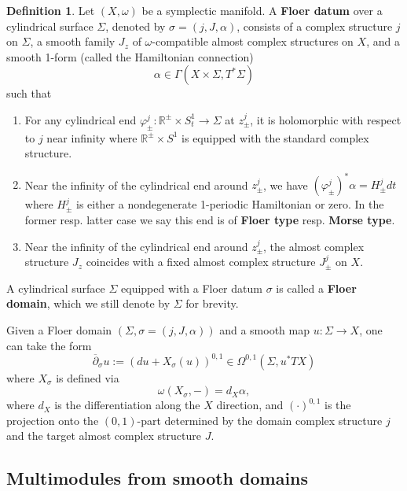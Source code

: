 \documentclass[reqno, 10pt]{amsart}
\numberwithin{equation}{section}
\numberwithin{equation}{section}
\theoremstyle{definition}
\newtheorem{defn}[thm]{Definition}
\theoremstyle{remark}
\newcommand{\beqn}{\begin{equation*}}
\newcommand{\eeqn}{\end{equation*}}
\newcommand{\ov}{\overline}
\newcommand{\mb}{\mathbb}
\begin{document}
\begin{defn}\label{defn_Floer_datum}
Let $(X, \omega)$ be a symplectic manifold. A {\bf Floer datum} over a cylindrical surface $\Sigma$, denoted by $\sigma = (j, J, \alpha)$, consists of a complex structure $j$ on $\Sigma$, a smooth family $J_z$ of $\omega$-compatible almost complex structures on $X$, and a smooth 1-form (called the Hamiltonian connection)
\beqn
\alpha \in \Gamma( X \times \Sigma, T^* \Sigma)
\eeqn
 such that 
\begin{enumerate}

\item For any cylindrical end $\varphi_\pm^j: {\mb R}^\pm \times S^1_t \to \Sigma$  at $z_\pm^j$, it is holomorphic with respect to $j$ near infinity where ${\mb R}^\pm \times S^1$ is equipped with the standard complex structure.

\item Near the infinity of the cylindrical end around $z_\pm^j$, we have $(\varphi_\pm^j)^* \alpha = H_\pm^j dt$ where $H_\pm^j$ is either a nondegenerate 1-periodic Hamiltonian or zero. In the former resp. latter case we say this end is of {\bf Floer type} resp. {\bf Morse type}.

\item Near the infinity of the cylindrical end around $z_\pm^j$, the almost complex structure $J_z$ coincides with a fixed almost complex structure $J_\pm^j$ on $X$.

\end{enumerate}

A cylindrical surface $\Sigma$ equipped with a Floer datum $\sigma$ is called a {\bf Floer domain}, which we still denote by $\Sigma$ for brevity.
\end{defn}

Given a Floer domain $(\Sigma, \sigma = (j, J, \alpha))$ and a smooth map $u: \Sigma \to X$, one can take the form
\beqn
\ov\partial_\sigma u:= (du + X_{\sigma}(u))^{0,1} \in \Omega^{0,1}(\Sigma, u^* TX)
\eeqn
where $X_{\sigma}$ is defined via 
\beqn
\omega(X_{\sigma}, -) = d_{X} \alpha,
\eeqn
where $d_{X}$ is the differentiation along the $X$ direction, and $(\cdot)^{0,1}$ is the projection onto the $(0, 1)$-part determined by the domain complex structure $j$ and the target almost complex structure $J$.


\subsection{Multimodules from smooth domains}
\end{document}
